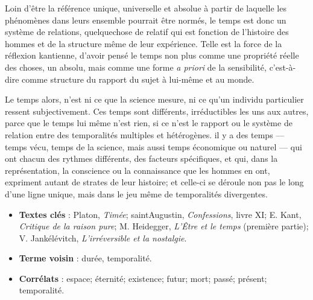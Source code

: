 Loin d'être la référence unique, universelle et absolue à partir de laquelle les phénomènes dans leurs ensemble pourrait être normés, le temps est donc un système de relations, quelquechose de relatif qui est fonction de l'histoire des hommes et de la structure même de leur expérience. Telle est la force de la réflexion kantienne, d'avoir pensé le temps non plus comme une propriété réelle des choses, un absolu, mais comme une forme {\it a priori} de la sensibilité, c'est-à-dire comme structure du rapport du sujet à lui-même et au monde.

Le temps alors, n'est ni ce que la science mesure, ni ce qu'un individu particulier ressent subjectivement. Ces temps sont différents, irréductibles les uns aux autres, parce que le temps lui même n'est rien, si ce n'est le rapport ou le système de relation entre des temporalités multiples et hétérogènes. il y a des temps — temps vécu, temps de la science, mais aussi temps économique ou naturel — qui ont chacun des rythmes différents, des facteurs spécifiques, et qui, dans la représentation, la conscience ou la connaissance que les hommes en ont, expriment autant de strates de leur histoire; et celle-ci se déroule non pas le long d'une ligne unique, mais dans le jeu même de temporalités divergentes.


\begin{itemize}[leftmargin=1cm, label=, itemsep=1pt]
\item {\bf Textes clés} : Platon, {\it Timée}; saintAugustin, {\it Confessions}, livre XI; E. Kant, {\it Critique de la raison pure}; M. Heidegger, {\it L'Être et le temps} (première partie); V. Jankélévitch, {\it L'irréversible et la nostalgie}.
\item {\bf Terme voisin} : durée, temporalité.
\item {\bf Corrélats} : espace; éternité; existence; futur; mort; passé; présent; temporalité.
\end{itemize}

